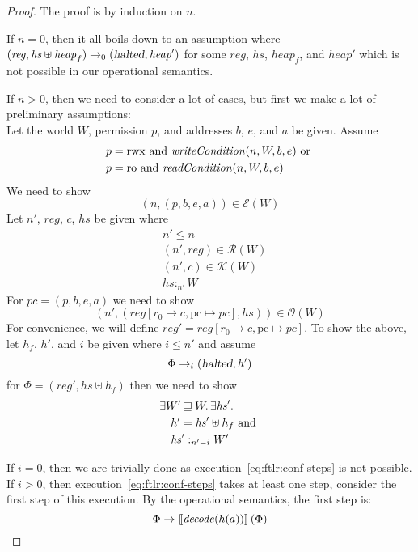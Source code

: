 \documentclass[a4paper]{article}
\newcommand{\sem}[1]{\left\llbracket #1 \right\rrbracket}
\newcommand{\var}[1]{\mathit{#1}}
\newcommand{\hs}{\var{hs}}
\newcommand{\pc}{\mathit{pc}}
\newcommand{\pcreg}{\mathrm{pc}}
\newcommand{\reg}{\var{reg}}
\newcommand{\heap}{\var{heap}}
\newcommand{\halted}{\textsl{halted}}
\newcommand{\plainfun}[2]{
  \ifthenelse{\equal{#2}{}}
             {\mathit{#1}}
             {\mathit{#1}(#2)}
}
\newcommand{\decode}{\plainfun{decode}{}}
\newcommand{\readCond}[1]{\plainfun{readCondition}{#1}}
\newcommand{\writeCond}[1]{\plainfun{writeCondition}{#1}}
\newcommand{\future}{\mathbin{\sqsupseteq}}
\newcommand{\heapSat}[3][\heap]{#1 :_{#2} #3}
\newcommand{\asmType}{\plaindom{AsmType}}
\newcommand{\plaindom}[1]{\mathrm{#1}}
\newcommand{\intr}[2]{\mathcal{#1}}
\newcommand{\exprintr}[1]{\intr{E}{#1}}
\newcommand{\contintr}[1]{\intr{K}{#1}}
\newcommand{\regintr}[1]{\intr{R}{#1}}
\newcommand{\stder}{\exprintr{\asmType}}
\newcommand{\stdrr}{\regintr{\asmType}}
\newcommand{\stdkr}{\contintr{\asmType}}
\newcommand{\observations}{\mathcal{O}}
\newcommand{\npair}[2][n]{\left(#1,#2 \right)}
\newcommand{\plainperm}[1]{\mathrm{#1}}
\newcommand{\readonly}{\plainperm{ro}}
\newcommand{\rwx}{\plainperm{rwx}}
\newcommand{\step}[1][]{\rightarrow_{#1}}
\begin{document}
\begin{proof}
  The proof is by induction on $n$.

If $n=0$, then it all boils down to an assumption where $(\reg, \hs \uplus \heap_f) \step[0] (\halted, \heap')$ for some $\reg$, $\hs$, $\heap_f$, and $\heap'$ which is not possible in our operational semantics.

If $n > 0$, then we need to consider a lot of cases, but first we make a lot of preliminary assumptions:\\
Let the world $W$, permission $p$, and addresses $b$, $e$, and $a$ be given. Assume
\begin{align}
  & p = \rwx \text{ and } \writeCond{n,W,b,e} \text{ or } \label{eq:ftlr:rwx-assump}\\
  & p = \readonly \text{ and } \readCond{n,W,b,e} \label{eq:ftlr:rx-assump}
\end{align}
We need to show 
\[
  \npair{(p,b,e,a)} \in \stder(W)
\]
Let $n'$, $\reg$, $c$, $\hs$ be given where
\begin{align}
  & n' \leq n \label{eq:ftlr:n-leq} \\
  & \npair[n']{\reg} \in \stdrr(W) \label{eq:ftlr:reg-in-stdrr}\\
  & \npair[n']{c} \in \stdkr(W) \label{eq:ftlr:cont-in-stdkr}\\
  & \heapSat[\hs]{n'}{W} \label{eq:ftlr:hs-heapsat}
\end{align}
For $\pc = (p,b,e,a)$ we need to show
\[
\npair[n']{(\reg[r_0 \mapsto c, \pcreg \mapsto \pc],\hs)} \in \observations(W)
\]
For convenience, we will define $\reg' = \reg[r_0 \mapsto c, \pcreg \mapsto \pc]$. To show the above, let $h_f$, $h'$, and $i$ be given where $i \leq n'$ and assume
\begin{equation}
  \label{eq:ftlr:conf-steps}
  \Phi \step[i] (\halted, h')
\end{equation}
for $\Phi = (\reg',\hs \uplus h_f)$ then we need to show
\begin{align}
  & \exists W' \future W \ldotp \exists \hs' \ldotp \nonumber \\
  & \quad h' =  \hs' \uplus h_f \text{ and } \label{eq:ftlr:final-heap-cond} \\
  & \quad \heapSat[\hs']{n'-i}{W'} \label{eq:ftlr:heap-sat-cond}
\end{align}

If $i=0$, then we are trivially done as execution~\ref{eq:ftlr:conf-steps} is not possible. If $i>0$, then execution~\ref{eq:ftlr:conf-steps} takes at least one step, consider the first step of this execution. By the operational semantics, the first step is:
\begin{equation*}
  \Phi \step \sem{\decode(h(a))}(\Phi)
\end{equation*}


\end{proof}
\end{document}

